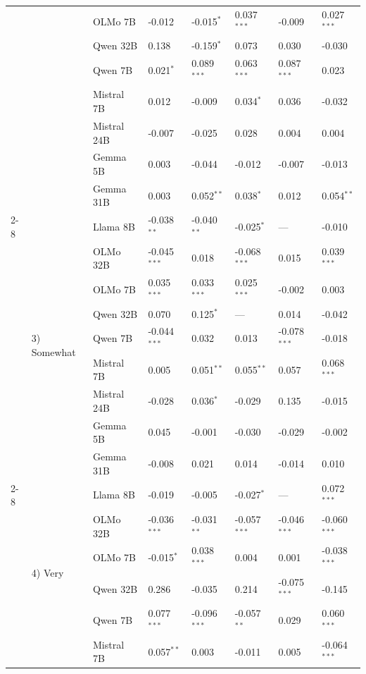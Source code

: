 \begin{longtable}[t]{llllllll}
 &  & OLMo 7B & -0.012 & -0.015$^{*}$ & 0.037$^{***}$ & -0.009 & 0.027$^{***}$ \\
 &  & Qwen 32B & 0.138 & -0.159$^{*}$ & 0.073 & 0.030 & -0.030 \\
 &  & Qwen 7B & 0.021$^{*}$ & 0.089$^{***}$ & 0.063$^{***}$ & 0.087$^{***}$ & 0.023 \\
 &  & Mistral 7B & 0.012 & -0.009 & 0.034$^{*}$ & 0.036 & -0.032 \\
 &  & Mistral 24B & -0.007 & -0.025 & 0.028 & 0.004 & 0.004 \\
 &  & Gemma 5B & 0.003 & -0.044 & -0.012 & -0.007 & -0.013 \\
 &  & Gemma 31B & 0.003 & 0.052$^{**}$ & 0.038$^{*}$ & 0.012 & 0.054$^{**}$ \\
\cline{2-8}
 & \multirow[t]{9}{*}{3) Somewhat} & Llama 8B & -0.038$^{**}$ & -0.040$^{**}$ & -0.025$^{*}$ & --- & -0.010 \\
 &  & OLMo 32B & -0.045$^{***}$ & 0.018 & -0.068$^{***}$ & 0.015 & 0.039$^{***}$ \\
 &  & OLMo 7B & 0.035$^{***}$ & 0.033$^{***}$ & 0.025$^{***}$ & -0.002 & 0.003 \\
 &  & Qwen 32B & 0.070 & 0.125$^{*}$ & --- & 0.014 & -0.042 \\
 &  & Qwen 7B & -0.044$^{***}$ & 0.032 & 0.013 & -0.078$^{***}$ & -0.018 \\
 &  & Mistral 7B & 0.005 & 0.051$^{**}$ & 0.055$^{**}$ & 0.057 & 0.068$^{***}$ \\
 &  & Mistral 24B & -0.028 & 0.036$^{*}$ & -0.029 & 0.135 & -0.015 \\
 &  & Gemma 5B & 0.045 & -0.001 & -0.030 & -0.029 & -0.002 \\
 &  & Gemma 31B & -0.008 & 0.021 & 0.014 & -0.014 & 0.010 \\
\cline{2-8}
 & \multirow[t]{9}{*}{4) Very} & Llama 8B & -0.019 & -0.005 & -0.027$^{*}$ & --- & 0.072$^{***}$ \\
 &  & OLMo 32B & -0.036$^{***}$ & -0.031$^{**}$ & -0.057$^{***}$ & -0.046$^{***}$ & -0.060$^{***}$ \\
 &  & OLMo 7B & -0.015$^{*}$ & 0.038$^{***}$ & 0.004 & 0.001 & -0.038$^{***}$ \\
 &  & Qwen 32B & 0.286 & -0.035 & 0.214 & -0.075$^{***}$ & -0.145 \\
 &  & Qwen 7B & 0.077$^{***}$ & -0.096$^{***}$ & -0.057$^{**}$ & 0.029 & 0.060$^{***}$ \\
 &  & Mistral 7B & 0.057$^{**}$ & 0.003 & -0.011 & 0.005 & -0.064$^{***}$ \\

\end{longtable}
